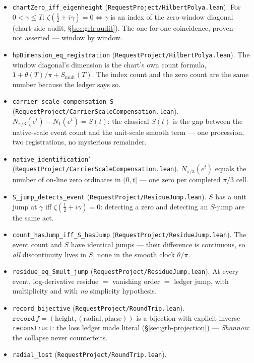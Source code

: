 \begin{itemize}
\item \texttt{chartZero\_iff\_eigenheight}
(\texttt{RequestProject/HilbertPolya.lean}). For \(0<\gamma\le T\):
\(\zeta(\tfrac12+i\gamma)=0\iff\gamma\) is an index of the zero-window
diagonal (chart-side audit, \S\ref{sec:grh-audit}). The one-for-one
coincidence, proven --- not asserted --- window by window.
\item \texttt{hpDimension\_eq\_registration}
(\texttt{RequestProject/HilbertPolya.lean}). The window diagonal's dimension
is the chart's own count formula, \(1+\theta(T)/\pi+S_{\mathrm{mult}}(T)\).
The index count and the zero count are the same number because the ledger
says so.
\item \texttt{carrier\_scale\_compensation\_S}
(\texttt{RequestProject/CarrierScaleCompensation.lean}).
\(N_{\pi/3}(e^{t})-N_{1}(e^{t})=S(t)\): the classical \(S(t)\) is the gap
between the native-scale event count and the unit-scale smooth term --- one
procession, two registrations, no mysterious remainder.
\item \texttt{native\_identification$'$}
(\texttt{RequestProject/CarrierScaleCompensation.lean}).
\(N_{\pi/3}(e^{t})\) equals the number of on-line zero ordinates in
\((0,t]\) --- one zero per completed \(\pi/3\) cell.
\item \texttt{S\_jump\_detects\_event}
(\texttt{RequestProject/ResidueJump.lean}). \(S\) has a unit jump at
\(\gamma\) iff \(\zeta(\tfrac12+i\gamma)=0\): detecting a zero and detecting
an \(S\)-jump are the same act.
\item \texttt{count\_hasJump\_iff\_S\_hasJump}
(\texttt{RequestProject/ResidueJump.lean}). The event count and \(S\) have
identical jumps --- their difference is continuous, so \emph{all}
discontinuity lives in \(S\), none in the smooth clock \(\theta/\pi\).
\item \texttt{residue\_eq\_Smult\_jump}
(\texttt{RequestProject/ResidueJump.lean}). At every event,
log-derivative residue \(=\) vanishing order \(=\) ledger jump, with
multiplicity and with \emph{no} simplicity hypothesis.
\item \texttt{record\_bijective} (\texttt{RequestProject/RoundTrip.lean}).
\(\texttt{record}\,f=(\text{height},(\text{radial},\text{phase}))\) is a
bijection with explicit inverse \texttt{reconstruct}: the loss ledger made
literal (\S\ref{sec:grh-projection}) --- \emph{Shannon}: the collapse never counterfeits.
\item \texttt{radial\_lost} (\texttt{RequestProject/RoundTrip.lean}).

\end{itemize}
